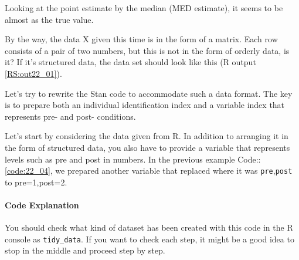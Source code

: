 \documentclass{ltjsbook}
\begin{document}

Looking at the point estimate by the median (MED estimate), it seems to be almost as the true value.

By the way, the data X given this time is in the form of a matrix. Each row consists of a pair of two numbers, but this is not in the form of orderly data, is it?
If it's structured data, the data set should look like this (R output \ref{RS:out22_01}).

Let's try to rewrite the Stan code to accommodate such a data format. The key is to prepare both an individual identification index and a variable index that represents pre- and post- conditions.

Let's start by considering the data given from R. In addition to arranging it in the form of structured data, you also have to provide a variable that represents levels such as pre and post in numbers. In the previous example Code::\ref{code:22_04}, we prepared another variable that replaced where it was \verb|pre|,\verb|post| to pre=1,post=2.

\paragraph{Code Explanation}

You should check what kind of dataset has been created with this code in the R console as \verb|tidy_data|. If you want to check each step, it might be a good idea to stop in the middle and proceed step by step.
\end{document}
